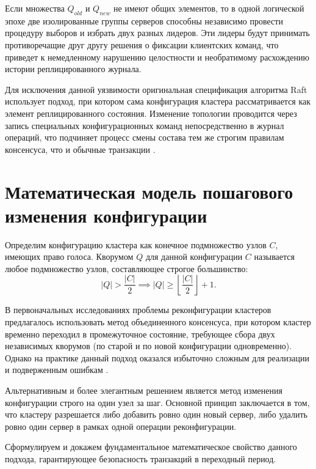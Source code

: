 Если множества $Q_{old}$ и $Q_{new}$ не имеют общих элементов, то в одной логической эпохе две изолированные группы серверов способны независимо провести процедуру выборов и избрать двух разных лидеров. Эти лидеры будут принимать противоречащие друг другу решения о фиксации клиентских команд, что приведет к немедленному нарушению целостности и необратимому расхождению истории реплицированного журнала.

Для исключения данной уязвимости оригинальная спецификация алгоритма Raft использует подход, при котором сама конфигурация кластера рассматривается как элемент реплицированного состояния. Изменение топологии проводится через запись специальных конфигурационных команд непосредственно в журнал операций, что подчиняет процесс смены состава тем же строгим правилам консенсуса, что и обычные транзакции \cite{raft_dissertation}.

\section{Математическая модель пошагового изменения конфигурации}
\label{sec:mem-lemma-intersection}

Определим конфигурацию кластера как конечное подмножество узлов $C$, имеющих право голоса. Кворумом $Q$ для данной конфигурации $C$ называется любое подмножество узлов, составляющее строгое большинство:
\begin{equation}
|Q| > \frac{|C|}{2} \implies |Q| \ge \left\lfloor \frac{|C|}{2} \right\rfloor + 1.
\end{equation}

В первоначальных исследованиях проблемы реконфигурации кластеров предлагалось использовать метод объединенного консенсуса, при котором кластер временно переходил в промежуточное состояние, требующее сбора двух независимых кворумов (по старой и по новой конфигурации одновременно). Однако на практике данный подход оказался избыточно сложным для реализации и подверженным ошибкам \cite{raft_dissertation}.

Альтернативным и более элегантным решением является метод изменения конфигурации строго на один узел за шаг. Основной принцип заключается в том, что кластеру разрешается либо добавить ровно один новый сервер, либо удалить ровно один сервер в рамках одной операции реконфигурации.

Сформулируем и докажем фундаментальное математическое свойство данного подхода, гарантирующее безопасность транзакций в переходный период.

